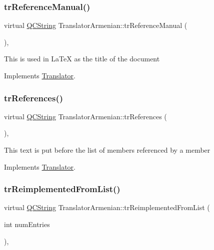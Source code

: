 \subsubsection{\texorpdfstring{trReferenceManual()}{trReferenceManual()}}
{\footnotesize\ttfamily virtual \mbox{\hyperlink{class_q_c_string}{Q\+C\+String}} Translator\+Armenian\+::tr\+Reference\+Manual (\begin{DoxyParamCaption}{ }\end{DoxyParamCaption})\hspace{0.3cm}{\ttfamily [inline]}, {\ttfamily [virtual]}}

This is used in La\+TeX as the title of the document 

Implements \mbox{\hyperlink{class_translator}{Translator}}.

\mbox{\label{class_translator_armenian_a78fd1ae50e9d62260bf5670bdb775bc0}} 
\subsubsection{\texorpdfstring{trReferences()}{trReferences()}}
{\footnotesize\ttfamily virtual \mbox{\hyperlink{class_q_c_string}{Q\+C\+String}} Translator\+Armenian\+::tr\+References (\begin{DoxyParamCaption}{ }\end{DoxyParamCaption})\hspace{0.3cm}{\ttfamily [inline]}, {\ttfamily [virtual]}}

This text is put before the list of members referenced by a member 

Implements \mbox{\hyperlink{class_translator}{Translator}}.

\mbox{\label{class_translator_armenian_ac9331db2fada46eff3864c96cb975b64}} 
\subsubsection{\texorpdfstring{trReimplementedFromList()}{trReimplementedFromList()}}
{\footnotesize\ttfamily virtual \mbox{\hyperlink{class_q_c_string}{Q\+C\+String}} Translator\+Armenian\+::tr\+Reimplemented\+From\+List (\begin{DoxyParamCaption}\item[{int}]{num\+Entries }\end{DoxyParamCaption})\hspace{0.3cm}{\ttfamily [inline]}, {\ttfamily [virtual]}}

